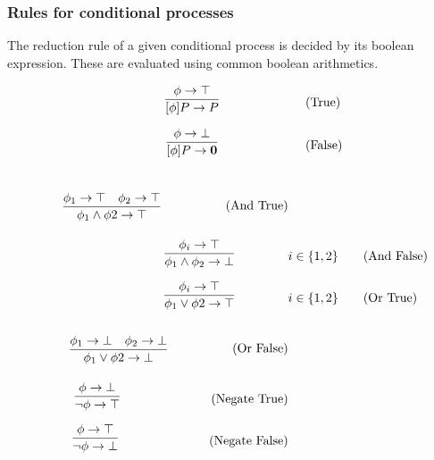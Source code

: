 \FloatBarrier

\subsubsection{Rules for conditional processes}
The reduction rule of a given conditional process is decided by its boolean expression. These are evaluated using common boolean arithmetics.

\begin{align}
	& \infrule{\phi \ra \top}{[\phi]P\ra P} \tag{True}\\
	& \infrule{\phi \ra \bot}{[\phi]P\ra \nil} \tag{False}
\end{align}

\begin{align*}
\infrule{\phi_1 \ra \top \quad \phi_2 \ra \top}{\phi_1 \wedge \phi2 \ra \top}\tag{And True}\\
\infrule{\phi_i \ra \top}{\phi_1 \wedge \phi_2 \ra \bot} &i\in \{1,2\}\tag{And False}\\
\infrule{\phi_i \ra \top}{\phi_1 \vee \phi2 \ra \top} &i\in \{1,2\} \tag{Or True}\\
\infrule{\phi_1 \ra \bot \quad \phi_2 \ra \bot}{\phi_1 \vee \phi2 \ra \bot} \tag{Or False}\\
\infrule{\phi \ra \bot}{\neg\phi \ra \top} \tag{Negate True}\\
\infrule{\phi \ra \top}{\neg\phi \ra \bot} \tag{Negate False}\\
\end{align*}

